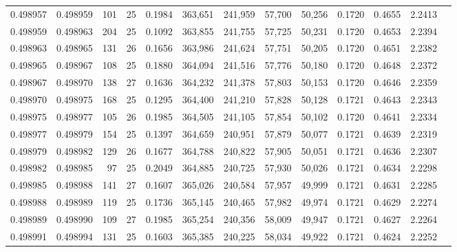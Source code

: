 \begin{tabular}{rrrrrrrrrrrrr}
0.498957 & 0.498959 & 101 &  25 &                                     0.1984 & 363,651 & 241,959 &  57,700 &  50,256 & 0.1720 & 0.4655 & 2.2413 \\
0.498959 & 0.498963 & 204 &  25 &                                     0.1092 & 363,855 & 241,755 &  57,725 &  50,231 & 0.1720 & 0.4653 & 2.2394 \\
0.498963 & 0.498965 & 131 &  26 &                                     0.1656 & 363,986 & 241,624 &  57,751 &  50,205 & 0.1720 & 0.4651 & 2.2382 \\
0.498965 & 0.498967 & 108 &  25 &                                     0.1880 & 364,094 & 241,516 &  57,776 &  50,180 & 0.1720 & 0.4648 & 2.2372 \\
0.498967 & 0.498970 & 138 &  27 &                                     0.1636 & 364,232 & 241,378 &  57,803 &  50,153 & 0.1720 & 0.4646 & 2.2359 \\
0.498970 & 0.498975 & 168 &  25 &                                     0.1295 & 364,400 & 241,210 &  57,828 &  50,128 & 0.1721 & 0.4643 & 2.2343 \\
0.498975 & 0.498977 & 105 &  26 &                                     0.1985 & 364,505 & 241,105 &  57,854 &  50,102 & 0.1720 & 0.4641 & 2.2334 \\
0.498977 & 0.498979 & 154 &  25 &                                     0.1397 & 364,659 & 240,951 &  57,879 &  50,077 & 0.1721 & 0.4639 & 2.2319 \\
0.498979 & 0.498982 & 129 &  26 &                                     0.1677 & 364,788 & 240,822 &  57,905 &  50,051 & 0.1721 & 0.4636 & 2.2307 \\
0.498982 & 0.498985 &  97 &  25 &                                     0.2049 & 364,885 & 240,725 &  57,930 &  50,026 & 0.1721 & 0.4634 & 2.2298 \\
0.498985 & 0.498988 & 141 &  27 &                                     0.1607 & 365,026 & 240,584 &  57,957 &  49,999 & 0.1721 & 0.4631 & 2.2285 \\
0.498988 & 0.498989 & 119 &  25 &                                     0.1736 & 365,145 & 240,465 &  57,982 &  49,974 & 0.1721 & 0.4629 & 2.2274 \\
0.498989 & 0.498990 & 109 &  27 &                                     0.1985 & 365,254 & 240,356 &  58,009 &  49,947 & 0.1721 & 0.4627 & 2.2264 \\
0.498991 & 0.498994 & 131 &  25 &                                     0.1603 & 365,385 & 240,225 &  58,034 &  49,922 & 0.1721 & 0.4624 & 2.2252 \\

\end{tabular}
